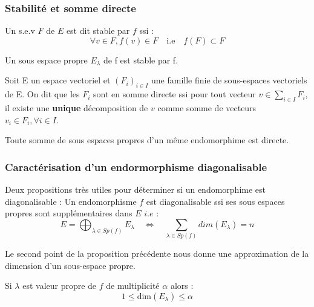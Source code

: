 \subsubsection{Stabilité et somme directe}

\begin{definition}
    Un s.e.v $F$ de $E$ est dit stable par $f$ ssi :
    \[ \forall v \in F, f(v) \in F \quad \text{i.e} \quad f(F) \subset F \]
\end{definition}

\begin{prop}
    Un sous espace propre $E_\lambda$ de f est stable par f. 
\end{prop}

\begin{definition}
    Soit E un espace vectoriel et $(F_i)_{i \in I}$ une famille finie de sous-espaces vectoriels de E. 
    On dit que les $F_i$ sont en somme directe ssi pour tout vecteur $v \in \sum_{i \in I} F_i$, il existe une \textbf{unique} 
    décomposition de $v$ comme somme de vecteurs $v_i \in F_i, \forall i \in I$. 
\end{definition}

\begin{prop}
    Toute somme de sous espaces propres d'un même endomorphime est directe. 
\end{prop}


\subsubsection{Caractérisation d'un endormorphisme diagonalisable}

\begin{proposition} Deux propositions très utiles pour déterminer si un endomorphime est diagonalisable : 
    Un endomorphisme $f$ est diagonalisable ssi ses sous espaces propres sont supplémentaires dans $E$ $i.e$ :
        \[ E = \bigoplus_{\lambda \in Sp(f)} E_\lambda \quad \iff \quad \sum_{\lambda \in Sp(f)} dim(E_\lambda) = n \]    
\end{proposition}

Le second point de la proposition précédente nous donne une approximation de la dimension d'un sous-espace propre. 

\begin{prop}
    Si $\lambda$ est valeur propre de $f$ de multiplicité $\alpha$ alors : $$ 1 \leq \text{dim} (E_\lambda) \leq \alpha $$ 
\end{prop}

